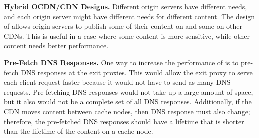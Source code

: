 \textbf{Hybrid OCDN/CDN Designs.}
Different origin servers have different needs, and each origin server might 
have different needs for different content.  The design of \system{} allows origin servers
 to publish some of their content on \system{} and some on other CDNs.  
This is useful in a case where some content is more sensitive, while other content needs 
better performance.

\textbf{Pre-Fetch DNS Responses.} 
One way to increase the performance of \system{} is to pre-fetch DNS responses at 
the exit proxies.  This would allow the exit proxy to serve each client request faster 
because it would not have to send as many DNS requests.  Pre-fetching DNS responses would 
not take up a large amount of space, but it also would not be a complete set of all DNS 
responses.  Additionally, if the CDN moves content between cache nodes, then DNS 
response must also change; therefore, the pre-fetched DNS responses should have a lifetime 
that is shorter than the lifetime of the content on a cache node.

%

